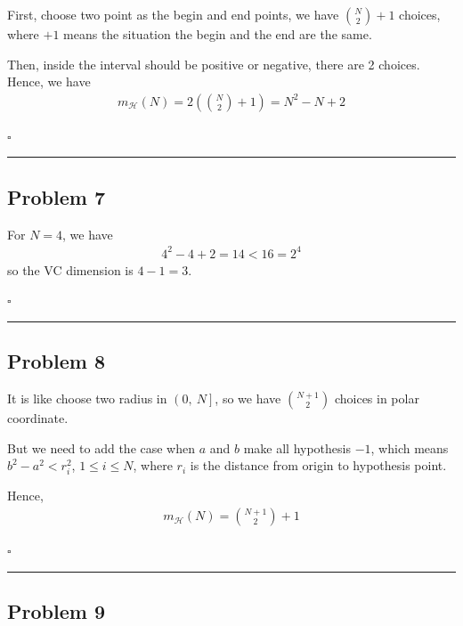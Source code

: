 \documentclass[12pt]{article}
\newcommand*{\QEDB}{\hfill\ensuremath{\square}}
\newcommand{\ParTh}[1]{\left(#1\right)}
\newcommand{\horrule}[1]{\rule{\linewidth}{#1}}
\begin{document}
First, choose two point as the begin and end points, we have $\binom{N}{2}+1$ choices, where $+1$ means the situation the begin and the end are the same.

Then, inside the interval should be positive or negative, there are 2 choices. Hence, we have
\begin{align}
m_{\mathcal{H}}\ParTh{N}=2\ParTh{\binom{N}{2}+1}=N^2-N+2
\end{align}

\QEDB

\horrule{0.5pt}

\subsection*{Problem 7}

For $N=4$, we have
\begin{align}
4^2-4+2=14<16=2^4
\end{align}
so the VC dimension is $4-1=3$.

\QEDB

\horrule{0.5pt}

\subsection*{Problem 8}

It is like choose two radius in ${\left(0,~N\right]}$, so we have $\binom{N+1}{2}$ choices in polar coordinate.

But we need to add the case when $a$ and $b$ make all hypothesis $-1$, which means $b^2 - a^2 < r^2_i$, $1\leq i\leq N$, where $r_i$ is the distance from origin to hypothesis point.

Hence,
\begin{align}
m_{\mathcal{H}}\ParTh{N}=\binom{N+1}{2}+1
\end{align}

\QEDB

\horrule{0.5pt}

\subsection*{Problem 9}
\end{document}
